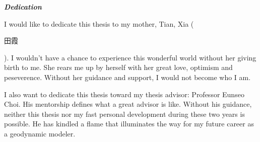 \begin{center}
\textbf{\textit{\large{Dedication}}}
\end{center}

I would like to dedicate this thesis to my mother, Tian, Xia (\begin{CJK}{UTF8}{gbsn}田霞\end{CJK}). I wouldn't have a chance to experience this wonderful world without her giving birth to me. She rears me up by herself with her great love, optimism and peseverence. Without her guidance and support, I would not become who I am.

I also want to dedicate this thesis toward my thesis advisor: Professor Eunseo Choi. His mentorship defines what a great advisor is like. Without his guidance, neither this thesis nor my fast personal development during these two years is possible. He has kindled a flame that illuminates the way for my future career as a geodynamic modeler.   

